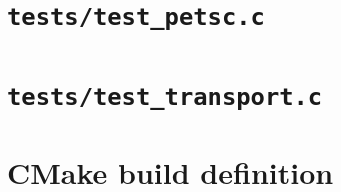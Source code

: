 \documentclass[9pt,a4paper]{extarticle}
\begin{document}
\section{\texttt{tests/test\_petsc.c}}

\clearpage
\section{\texttt{tests/test\_transport.c}}

\clearpage
\section{CMake build definition}

\end{document}
